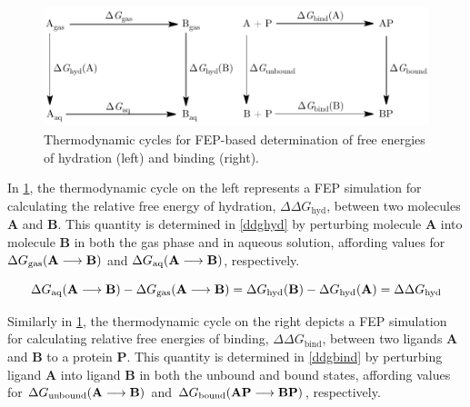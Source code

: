 \documentclass[12pt]{report}
\begin{document}
\vspace*{0.2cm}
\begin{figure}[htbp]
\centering
\includegraphics[scale=0.99]{figures/pdf/thermocycle.pdf}
\caption{Thermodynamic cycles for FEP-based determination of free energies of hydration (left) and binding (right).}
\label{thermocycle}
\end{figure}
\vspace*{0.2cm}

In \cref{thermocycle}, the thermodynamic cycle on the left represents a FEP simulation for calculating the relative free energy of hydration, $\Delta\Delta G_{\textrm{hyd}}$, between two molecules \textbf{A} and \textbf{B}. This quantity is determined in \cref{ddghyd} by perturbing molecule \textbf{A} into molecule \textbf{B} in both the gas phase and in aqueous solution, affording values for $\Delta G_{\textrm{gas}}(\textrm{\textbf{A}} \longrightarrow \textrm{\textbf{B}})$ and $\Delta G_{\textrm{aq}}(\textrm{\textbf{A}} \longrightarrow \textrm{\textbf{B}})$, respectively. \vspace*{-0.4cm}

\vspace*{-0.4cm}
\begin{equation}
\label{ddghyd}
\Delta G_{\textrm{aq}}(\textrm{\textbf{A}} \longrightarrow \textrm{\textbf{B}}) - \Delta G_{\textrm{gas}}(\textrm{\textbf{A}} \longrightarrow \textrm{\textbf{B}}) = \Delta G_{\textrm{hyd}}(\textrm{\textbf{B}}) - \Delta G_{\textrm{hyd}}(\textrm{\textbf{A}}) = \Delta\Delta G_{\textrm{hyd}}
\end{equation}
\vspace*{-0.8cm}

Similarly in \cref{thermocycle}, the thermodynamic cycle on the right depicts a FEP simulation for calculating relative free energies of binding, $\Delta\Delta G_{\textrm{bind}}$, between two ligands \textbf{A} and \textbf{B} to a protein \textbf{P}. This quantity is determined in \cref{ddgbind} by perturbing ligand \textbf{A} into ligand \textbf{B} in both the unbound and bound states, affording values for $\Delta G_{\textrm{unbound}}(\textrm{\textbf{A}} \longrightarrow \textrm{\textbf{B}})$ and $\Delta G_{\textrm{bound}}(\textrm{\textbf{AP}} \longrightarrow \textrm{\textbf{BP}})$, respectively. 
\end{document}
